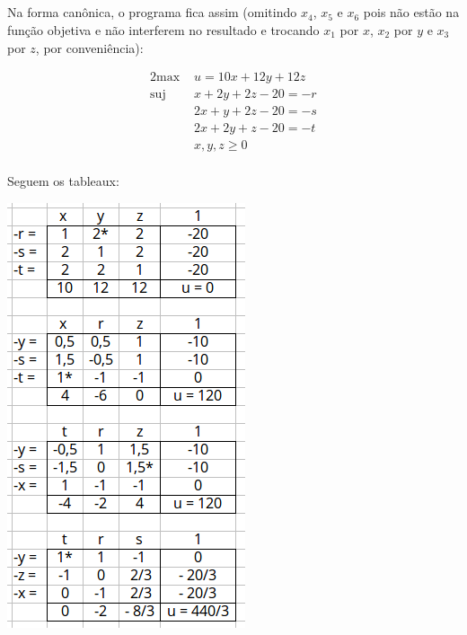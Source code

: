 \documentclass[12pt,letterpaper]{article}
\begin{document}
	 \subsection{ }
	
	 \subsection{ }
	 
	 Na forma canônica, o programa fica assim (omitindo $x_4$, $x_5$ e $x_6$ pois não estão na função objetiva e não interferem no resultado e trocando $x_1$ por $x$, $x_2$ por $y$ e $x_3$ por $z$, por conveniência):
	 
	 \begin{alignat*}{2}
	 \text{max  } & u = 10x+12y+12z  \\
	 \text{suj  } & x+2y+2z -20 = -r\\
				  & 2x+y+2z -20 = -s\\
				  & 2x+2y+z -20 = -t\\
				  & x,y,z \geq 0\\
	 \end{alignat*}
	 
	 Seguem os tableaux:
	 
	 \begin{center}
	 	 \includegraphics{3-1.png}
	 \end{center}
	 
	 
\end{document}
